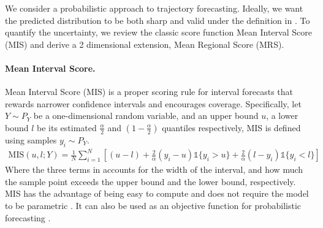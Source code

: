 
We consider a probabilistic approach to trajectory forecasting. Ideally, we want the predicted distribution to be both sharp and valid under the definition in . To quantify the uncertainty, we review the classic score function Mean Interval Score (MIS) and derive a 2 dimensional extension, Mean Regional Score (MRS).





\paragraph{Mean Interval Score.}
Mean Interval Score (MIS) is a proper scoring rule \cite{properscoring} for interval forecasts that rewards narrower confidence intervals and encourages coverage. 
%
Specifically, let $Y  \sim {P}_Y$ be a one-dimensional random variable, and an upper bound $u$, a lower bound $l$ be its estimated $\frac{\alpha}{2}$ and $(1-\frac{\alpha}{2})$ quantiles respectively, MIS is defined using samples $y_i \sim {P}_Y$.
\begin{align}
    \mathrm{MIS}(u,l; Y) = \frac{1}{N} \sum_{i=1}^{N}[(u-l) +
     \frac{2}{\alpha}(y_i-u)\mathbb{1}\{y_i>u\}\nonumber 
     + \frac{2}{\alpha}(l-y_i)\mathbb{1}\{y_i<l\} ] 
    \label{eq:mis}
\end{align}
%
Where the three terms in   accounts for the width of the interval, and how much the sample point exceeds the upper bound and the lower bound, respectively. MIS has the advantage of being easy to compute and does not require the model to be parametric \cite{properscoring}. It can also be used as an objective function for probabilistic forecasting \cite{wu2021quantifying}. 


